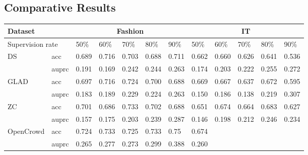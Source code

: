 \subsection{Comparative Results}
\begin{table*}[!h]
\begin{tabular}{|l|l|l|l|l|l|l|l|l|l|l|l|}
\hline
\multicolumn{2}{|l|}{Dataset}          & \multicolumn{5}{c|}{Fashion}          & \multicolumn{5}{c|}{IT}               \\ \hline
\multicolumn{2}{|l|}{Supervision rate} & 50\%  & 60\%  & 70\%  & 80\%  & 90\%  & 50\%  & 60\%  & 70\%  & 80\%  & 90\%  \\ \hline
\multirow{2}{*}{DS}          & acc     & 0.689 & 0.716 & 0.703 & 0.688 & 0.711 & 0.662 & 0.660 & 0.626 & 0.641 & 0.536 \\ \cline{2-12} 
                             & auprc   & 0.191 & 0.169 & 0.242 & 0.244 & 0.263 & 0.174 & 0.203 & 0.222 & 0.255 & 0.272 \\ \hline
\multirow{2}{*}{GLAD}        & acc     & 0.697 & 0.716 & 0.724 & 0.700 & 0.688 & 0.669 & 0.667 & 0.637 & 0.672 & 0.595 \\ \cline{2-12} 
                             & auprc   & 0.183 & 0.189 & 0.229 & 0.224 & 0.263 & 0.150 & 0.186 & 0.138 & 0.219 & 0.307 \\ \hline
\multirow{2}{*}{ZC}          & acc     & 0.701 & 0.686 & 0.733 & 0.702 & 0.688 & 0.651 & 0.674 & 0.664 & 0.683 & 0.627 \\ \cline{2-12} 
                             & auprc   & 0.157 & 0.175 & 0.203 & 0.239 & 0.287 & 0.146 & 0.198 & 0.212 & 0.246 & 0.234 \\ \hline
\multirow{2}{*}{OpenCrowd}   & acc     & 0.724 & 0.733 & 0.725 & 0.733 & 0.75  & 0.674 &       &       &       &       \\ \cline{2-12} 
                             & auprc   & 0.265 & 0.277 & 0.273 & 0.299 & 0.388 & 0.260 &       &       &       &       \\ \hline
\end{tabular}
\end{table*}
\label{sec:compres}